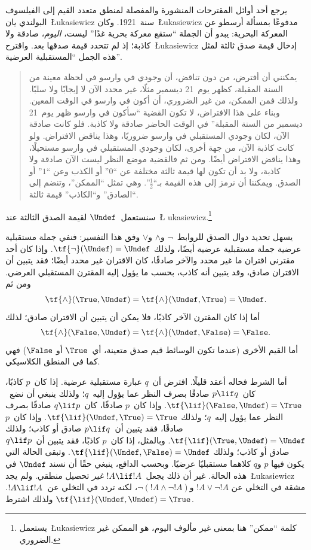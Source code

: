 \documentclass[../../../include/open-logic-section]{subfiles}
\begin{document}


يرجع أحد أوائل المقترحات المنشورة والمفصلة لمنطق متعدد القيم إلى
الفيلسوف البولندي يان~\L ukasiewicz سنة~1921. وكان~\L ukasiewicz
مدفوعًا بمسألة
أرسطو عن المعركة البحرية: يبدو أن الجملة ``ستقع معركة بحرية غدًا''
ليست، \emph{اليوم}، صادقة ولا كاذبة؛ إذ لم تتحدد قيمة صدقها بعد.
واقترح~\L ukasiewicz إدخال قيمة صدق ثالثة لمثل هذه الجمل
``المستقبلية العرضية''.
\begin{quote}
يمكنني أن أفترض، من دون تناقض، أن وجودي في وارسو في لحظة معينة من
السنة المقبلة، كظهر يوم~21 ديسمبر مثلًا، غير محدد الآن لا إيجابًا ولا
سلبًا. ولذلك فمن الممكن، من غير الضروري، أن أكون في وارسو في الوقت
المعين. وبناء على هذا الافتراض، لا تكون القضية ``سأكون في وارسو ظهر
يوم~21 ديسمبر من السنة المقبلة'' في الوقت الحاضر صادقة ولا كاذبة.
فلو كانت صادقة الآن، لكان وجودي المستقبلي في وارسو ضروريًا، وهذا يناقض
الافتراض. ولو كانت كاذبة الآن، من جهة أخرى، لكان وجودي المستقبلي في
وارسو مستحيلًا، وهذا يناقض الافتراض أيضًا. ومن ثم فالقضية موضع النظر
ليست الآن صادقة ولا كاذبة، ولا بد أن تكون لها قيمة ثالثة مختلفة عن
``$0$'' أو الكذب وعن ``$1$'' أو الصدق. ويمكننا أن نرمز إلى هذه القيمة
بـ``$\frac{1}{2}$''. وهي تمثل ``الممكن''، وتنضم إلى ``الصادق''
و``الكاذب'' قيمة ثالثة.
\end{quote}
سنستعمل~$\Undef$ لقيمة الصدق الثالثة عند~\L
ukasiewicz.\footnote{يستعمل~\L ukasiewicz كلمة ``ممكن'' هنا بمعنى
غير مألوف اليوم، هو الممكن غير الضروري.}

يسهل تحديد دوال الصدق للروابط~$\lnot$ و$\land$ و$\lor$ وفق هذا
التفسير: فنفي جملة مستقبلية عرضية جملة مستقبلية عرضية أيضًا، ولذلك
$\tf{\lnot}(\Undef) = \Undef$. وإذا كان أحد مقترني اقتران ما غير
محدد والآخر صادقًا، كان الاقتران غير محدد أيضًا؛ فقد يتبين أن الاقتران
صادق، وقد يتبين أنه كاذب، بحسب ما يؤول إليه المقترن المستقبلي العرضي.
ومن ثم
\[
    \tf{\land}(\True, \Undef) =
\tf{\land}(\Undef, \True) =
\Undef.
\]
أما إذا كان المقترن الآخر كاذبًا، فلا يمكن أن يتبين أن الاقتران صادق؛
لذلك
\[\tf{\land}(\False, \Undef) =
\tf{\land}(\Undef, \False) = \False.\]
أما القيم الأخرى (عندما تكون الوسائط قيم صدق متعينة، أي~$\True$ أو
$\False$) فهي كما في المنطق الكلاسيكي.

أما الشرط فحاله أعقد قليلًا. افترض أن~$q$ عبارة مستقبلية عرضية. إذا
كان~$p$ كاذبًا، كان~$p \lif q$ صادقًا بصرف النظر عما يؤول إليه~$q$؛
ولذلك ينبغي أن نضع~$\tf{\lif}(\False, \Undef) = \True$. وإذا كان~$p$
صادقًا، كان~$q \lif p$ صادقًا بصرف النظر عما يؤول إليه~$q$؛ ولذلك
$\tf{\lif}(\Undef, \True) = \True$. وإذا كان~$p$ صادقًا، فقد يتبين
أن~$p \lif q$ صادق أو كاذب؛ ولذلك
$\tf{\lif}(\True, \Undef) = \Undef$. وبالمثل، إذا كان~$p$ كاذبًا،
فقد يتبين أن~$q \lif p$ صادق أو كاذب؛ ولذلك
$\tf{\lif}(\Undef, \False) = \Undef$. وتبقى الحالة التي يكون فيها
$p$ و$q$ كلاهما مستقبليًا عرضيًا. وبحسب الدافع، ينبغي حقًا أن نسند
$\Undef$ في هذه الحالة. غير أن ذلك يجعل~$!A \lif !A$ \emph{غير}
تحصيل منطقي. ولم يجد~\L ukasiewicz مشقة في التخلي عن
$!A \lor \lnot !A$ و$\lnot(!A \land \lnot !A)$، لكنه تردد في التخلي
عن~$!A \lif !A$. ولذلك اشترط
$\tf{\lif}(\Undef, \Undef) = \True$.
\end{document}

